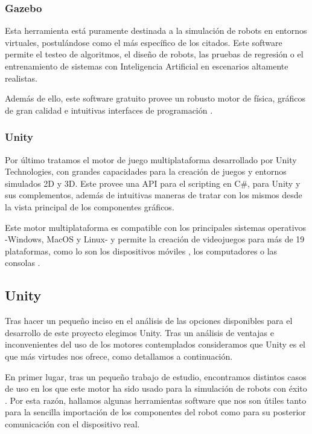 \subsubsection{Gazebo}

Esta herramienta está puramente destinada a la simulación de robots en entornos virtuales, postulándose como el más específico de los citados. Este software permite el testeo de algoritmos, el diseño de robots, las pruebas de regresión o el entrenamiento de sistemas con Inteligencia Artificial en escenarios altamente realistas. 

Además de ello, este software gratuito provee un robusto motor de física, gráficos de gran calidad e intuitivas interfaces de programación \cite{53}.

\subsubsection{Unity}

Por último tratamos el motor de juego multiplataforma desarrollado por Unity Technologies, con grandes capacidades para la creación de juegos y entornos simulados 2D y 3D. Este provee una API para el scripting en C\#, para Unity y sus complementos, además de intuitivas maneras de tratar con los mismos desde la vista principal de los componentes gráficos.

Este motor multiplataforma es compatible con los principales sistemas operativos -Windows, MacOS y Linux- y permite la creación de videojuegos para más de 19 plataformas, como lo son los dispositivos móviles , los computadores o las consolas \cite{54}. 




\subsection{Unity}		

Tras hacer un pequeño inciso en el análisis de las opciones disponibles para el desarrollo de este proyecto elegimos Unity. Tras un análisis de ventajas e inconvenientes del uso de los motores contemplados consideramos que Unity es el que más virtudes nos ofrece, como detallamos a continuación.

En primer lugar, tras un pequeño trabajo de estudio, encontramos distintos casos de uso en los que este motor ha sido usado para la simulación de robots con éxito \cite{55}. Por esta razón, hallamos algunas herramientas software que nos son útiles tanto para la sencilla importación de los componentes del robot como para su posterior comunicación con el dispositivo real.

